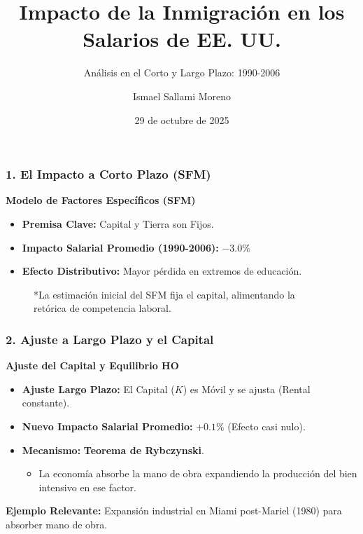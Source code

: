 \documentclass{beamer}
\title{Impacto de la Inmigración en los Salarios de EE. UU.}
\subtitle{Análisis en el Corto y Largo Plazo: 1990-2006}
\author{Ismael Sallami Moreno}
\institute{UGR}
\date{29 de octubre de 2025}
\begin{document}

\begin{frame}
\titlepage
\end{frame}


\begin{frame}
\frametitle{1. El Impacto a Corto Plazo (SFM)}

\begin{block}{\textbf{Modelo de Factores Específicos (SFM)}}
\begin{itemize}
    \item \textbf{Premisa Clave:} Capital y Tierra son \alert{Fijos}.
    \item \textbf{Impacto Salarial Promedio (1990-2006):} $\mathbf{-3.0\%}$
    \item \textbf{Efecto Distributivo:} Mayor pérdida en extremos de educación.
\end{itemize}
\end{block}

\vfill

\begin{figure}
\centering
\caption{Pérdida Salarial Estimada (SFM, 1990-2006)}
\caption*{*La estimación inicial del SFM fija el capital, alimentando la retórica de competencia laboral.}
\end{figure}

\end{frame}


\begin{frame}
\frametitle{2. Ajuste a Largo Plazo y el Capital}

\begin{block}{\textbf{Ajuste del Capital y Equilibrio HO}}
\begin{itemize}
    \item \textbf{Ajuste Largo Plazo:} El Capital ($K$) es \alert{Móvil} y se ajusta (Rental constante).
    \item \textbf{Nuevo Impacto Salarial Promedio:} $\mathbf{+0.1\%}$ (Efecto casi nulo).
    \item \textbf{Mecanismo:} \textbf{Teorema de Rybczynski}.
    \begin{itemize}
        \item La economía absorbe la mano de obra expandiendo la producción del bien intensivo en ese factor.
    \end{itemize}
\end{itemize}
\end{block}

\vfill

\textbf{Ejemplo Relevante:} Expansión industrial en Miami post-Mariel (1980) para absorber mano de obra.

\end{frame}
\end{document}
